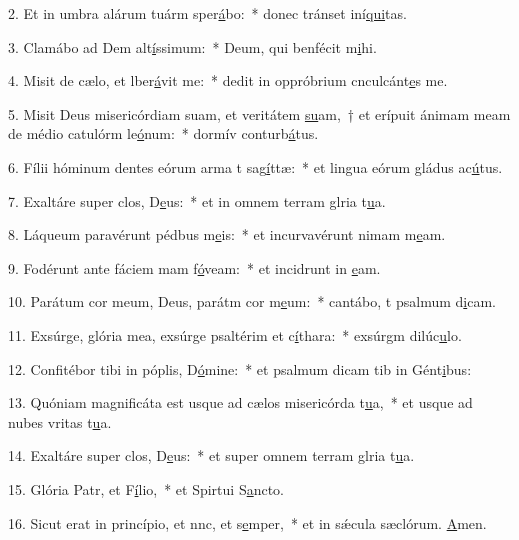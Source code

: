 2. Et in umbra alárum tuárm sper\uline{á}bo:~* donec tránset iní\uline{qui}tas.\par 
3. Clamábo ad Dem alt\uline{í}ssimum:~* Deum, qui benfécit m\uline{i}hi.\par 
4. Misit de cælo, et lber\uline{á}vit me:~* dedit in oppróbrium cnculcánt\uline{e}s me.\par 
5. Misit Deus misericórdiam suam, et veritátem \uline{su}am,~† et erípuit ánimam meam de médio catulórm le\uline{ó}num:~* dormív conturb\uline{á}tus.\par 
6. Fílii hóminum dentes eórum arma t sag\uline{í}ttæ:~* et lingua eórum gládus ac\uline{ú}tus.\par 
7. Exaltáre super clos, D\uline{e}us:~* et in omnem terram glria t\uline{u}a.\par 
8. Láqueum paravérunt pédbus m\uline{e}is:~* et incurvavérunt nimam m\uline{e}am.\par 
9. Fodérunt ante fáciem mam f\uline{ó}veam:~* et incidrunt in \uline{e}am.\par 
10. Parátum cor meum, Deus, parátm cor m\uline{e}um:~* cantábo, t psalmum d\uline{i}cam.\par 
11. Exsúrge, glória mea, exsúrge psaltérim et c\uline{í}thara:~* exsúrgm dilúc\uline{u}lo.\par 
12. Confitébor tibi in póplis, D\uline{ó}mine:~* et psalmum dicam tib in Gént\uline{i}bus:\par 
13. Quóniam magnificáta est usque ad cælos misericórda t\uline{u}a,~* et usque ad nubes vritas t\uline{u}a.\par 
14. Exaltáre super clos, D\uline{e}us:~* et super omnem terram glria t\uline{u}a.\par 
15. Glória Patr, et F\uline{í}lio,~* et Spirtui S\uline{a}ncto.\par 
16. Sicut erat in princípio, et nnc, et s\uline{e}mper,~* et in sǽcula sæclórum. \uline{A}men.\par 
